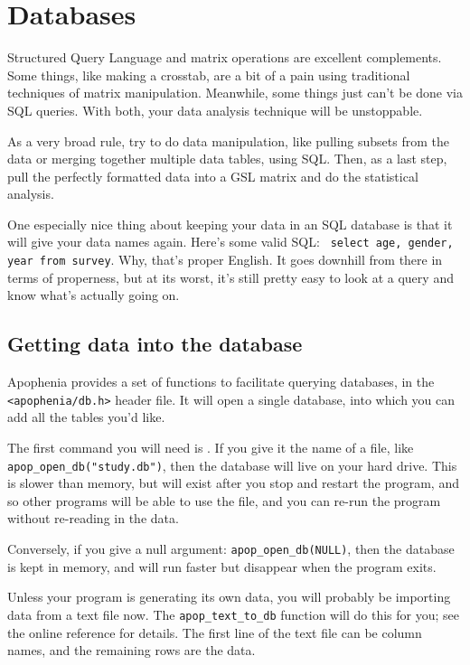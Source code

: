 \chapter{Databases} \label{sql}

Structured Query Language and matrix operations are excellent complements. Some things, like
making a crosstab, are a bit of a pain using traditional techniques of
matrix manipulation. Meanwhile, some things just can't be done via SQL
queries. With both, your data analysis technique will be unstoppable.

As a very broad rule, try to do data manipulation, like pulling subsets
from the data or merging together multiple data tables, using SQL. Then,
as a last step, pull the perfectly formatted data into a GSL matrix and
do the statistical analysis. 

One especially nice thing about keeping your data in an SQL database
is that it will give your data names again. Here's some valid SQL: {\tt
select age, gender, year from survey}. Why, that's proper English. It
goes downhill from there in terms of properness, but at its worst, it's
still pretty easy to look at a query and know what's actually going on.

\section{Getting data into the database}
Apophenia provides a set of functions to facilitate querying databases,
in the {\tt <apophenia/db.h>} header file. It will open
a single database, into which you can add all the tables you'd like.

The first command you will need is . If you give
it the name of a file, like {\tt apop\_open\_db("study.db")}, then the
database will live on your hard drive. This is slower than memory, but
will exist after you stop and restart the program, and so other programs
will be able to use the file, and you can re-run the program without
re-reading in the data.

Conversely, if you give a null argument: {\tt apop\_open\_db(NULL)},
then the database is kept in memory, and will run faster but 
disappear when the program exits.


Unless your program is generating its own data, you will probably
be importing data from a text file now.  The {\tt apop\_text\_to\_db}
function will do this for you; see the online reference for details. The
first line of the text file can be column names, and the remaining rows
are the data.


